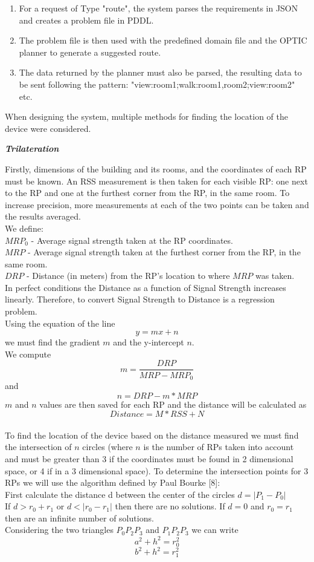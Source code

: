 \begin{enumerate}
\item For a request of Type "route", the system parses the requirements in JSON and creates a problem file in PDDL. 
\item The problem file is then used with the predefined domain file and the OPTIC planner to generate a suggested route.
\item The data returned by the planner must also be parsed, the resulting data to be sent following the pattern:
 "view:room1;walk:room1,room2;view:room2" etc.
\end{enumerate}

\noindent When designing the system, multiple methods for finding the location of the device were considered.

\noindent \textit{\textbf{Trilateration}}

Firstly, dimensions of the building and its rooms, and the coordinates of each RP must be known. An RSS measurement is then taken for each visible RP: one next to the RP and one at the furthest corner from the RP, in the same room. To increase precision, more measurements at each of the two points can be taken and the results averaged. \\ 
We define: \\
$MRP_0$ - Average signal strength taken at the RP coordinates. \\
$MRP$ - Average signal strength taken at the furthest corner from the RP, in the same room. \\
$DRP$ - Distance (in meters) from the RP's location to where $MRP$ was taken.\\
In perfect conditions the Distance as a function of Signal Strength increases linearly. Therefore, to convert Signal Strength to Distance is a regression problem.\\
Using the equation of the line $$y = mx + n$$ we must find the gradient $m$ and the y-intercept $n$.\\
We compute $$m = \frac{DRP}{MRP - MRP_0}$$
and $$n  = DRP - m * MRP$$
$m$ and $n$ values are then saved for each RP and the distance will be calculated as $$Distance  = M * RSS + N$$
\\
To find the location of the device based on the distance measured we must find the intersection of $n$ circles (where $n$ is the number of RPs taken into account and must be greater than 3 if the coordinates must be found in 2 dimensional space, or 4 if in a 3 dimensional space).  To determine the intersection points for 3 RPs we will use the algorithm defined by Paul Bourke [8]:\\
First calculate the distance d between the center of the circles $d = |P_1 - P_0|$\\
If $d > r_0 + r_1$ or $d < |r_0 - r_1|$ then there are no solutions. If $d = 0$ and $r_0 = r_1$ then are an infinite number of solutions.\\
Considering the two triangles $P_0P_2P_3$ and $P_1P_2P_3$ we can write $$a^2 + h^2 = r_0^2$$ $$b^2 + h^2 = r_1^2$$

